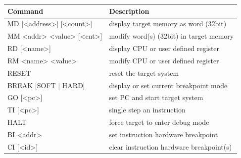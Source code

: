 \begin{table}[H]
\begin{tabular}{ll} %
\textbf{Command}	 &\textbf{Description}\\
\hline
\hline
MD [<address>] [<count>] & display target memory as word (32bit)\\
MM <addr> <value> [<cnt>] & modify word(s) (32bit) in target memory\\
RD [<name>] & display CPU or user defined register\\
RM <name> <value> &modify CPU or user defined register\\
RESET &reset the target system\\
BREAK [SOFT | HARD] & display or set current breakpoint mode\\
GO [<pc>] & set PC and start target system\\
TI [<pc>] & single step an instruction\\
HALT &force target to enter debug mode\\
BI <addr> &set instruction hardware breakpoint\\
CI [<id>] & clear instruction hardware breakpoint(s)\\

\end{tabular}
\end{table}
